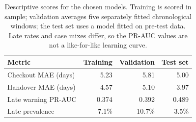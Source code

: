 \begin{table}[H]
\centering\small
\caption{Descriptive scores for the chosen models. Training is scored in sample; validation averages five separately fitted chronological windows; the test set uses a model fitted on pre-test data. Late rates and case mixes differ, so the PR-AUC values are not a like-for-like learning curve.}
\label{tab:split-summary}
\begin{tabular}{@{}lrrr@{}}
\toprule
Metric & Training & Validation & Test set \\
\midrule
Checkout MAE (days) & 5.23 & 5.81 & 5.00 \\
Handover MAE (days) & 4.57 & 5.10 & 3.97 \\
Late warning PR-AUC & 0.374 & 0.392 & 0.489 \\
Late prevalence & 7.1\% & 10.7\% & 3.5\% \\
\bottomrule
\end{tabular}
\end{table}
